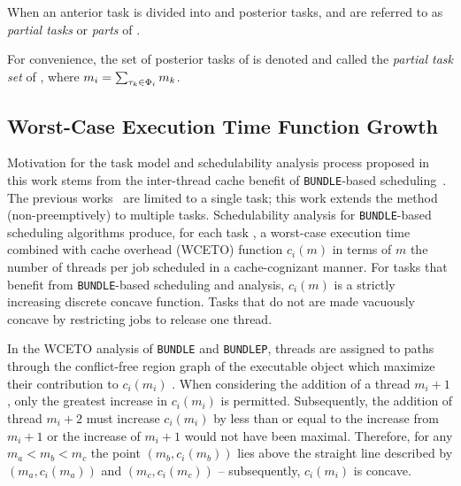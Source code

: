 \documentclass[a4paper,UKenglish,cleveref,autoref,english]{lipics-v2019}
\newcommand{\bundlep}{\texttt{BUNDLEP}}
\newcommand{\bundle}{\texttt{BUNDLE}}
\begin{document}
\begin{definition}
\label{def:partial-tasks}
When an anterior task  is divided into  and 
posterior tasks,  and  are referred to as
\emph{partial tasks} or \emph{parts} of .
\end{definition}

\begin{definition}
  \label{def:partial-task-set}
  For convenience, the set of posterior tasks of  is denoted
   and called the \emph{partial task set} of , 
  where ${m_i = \sum_{\tau_{k} \in \Phi_{i}} m_k}$.
\end{definition}

\subsection{Worst-Case Execution Time Function Growth}
\label{sec:discrete-growth}

Motivation for the task model and schedulability analysis process
proposed in this work stems from the inter-thread cache benefit of
\texttt{BUNDLE}-based scheduling~\cite{Tessler:2016,
  Tessler:2018}. The previous works~\cite{Tessler:2016, Tessler:2018}
are limited to a single task; this work extends the method
(non-preemptively) to multiple tasks. Schedulability analysis for
\texttt{BUNDLE}-based scheduling algorithms produce, for each task
, a worst-case execution time combined with cache overhead
(WCETO) function ${c_i(m)}$ in terms of ${m}$ the number of threads
per job scheduled in a cache-cognizant manner. For tasks that benefit
from \texttt{BUNDLE}-based scheduling and analysis, ${c_i(m)}$ is a
strictly increasing discrete concave function. Tasks that do not are
made vacuously concave by restricting jobs to release one thread.

In the WCETO analysis of \bundle{} and \bundlep{}, threads are
assigned to paths through the conflict-free region graph of the
executable object which maximize their contribution to
${c_i(m_i)}$ . When considering the addition of a thread ${m_i + 1}$,
only the greatest increase in ${c_i(m_i)}$ is permitted. Subsequently,
the addition of thread ${m_i + 2}$ must increase ${c_i(m_i)}$ by less
than or equal to the increase from ${m_i + 1}$ or the increase of
${m_i + 1}$ would not have been maximal. Therefore, for any ${m_a <
  m_b < m_c}$ the point ${(m_b, c_i(m_b))}$ lies above the straight line
described by ${(m_a, c_i(m_a))}$ and ${(m_c, c_i(m_c))}$ --
subsequently, ${c_i(m_i)}$ is concave.
\end{document}
